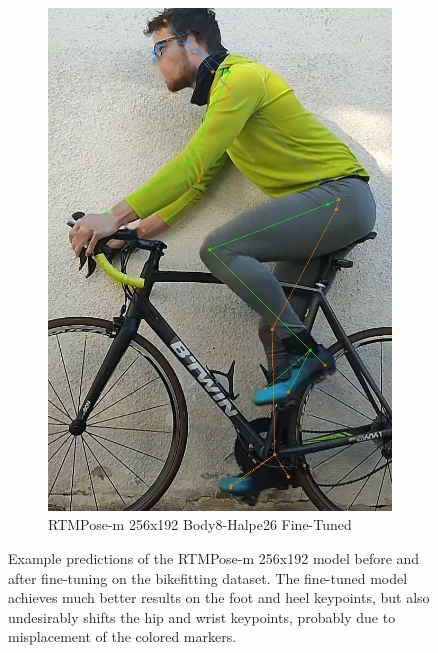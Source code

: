 \begin{figure}[htb]
\begin{subfigure}[t]{\imgwidth}
    \end{subfigure}
    \hfill
    \begin{subfigure}[t]{\imgwidth}
        \centering

        \includegraphics[width=\smallimgwidth]{obrazky-figures/rtmpose-m-256x192_trainedzlute_196_crop.jpg}
        \caption{RTMPose-m 256x192 Body8-Halpe26 Fine-Tuned}
    \end{subfigure}
    \caption{
        Example predictions of the RTMPose-m 256x192 model before and after fine-tuning on the bikefitting dataset. The fine-tuned model achieves much better results on the foot and heel keypoints, but also undesirably shifts the hip and wrist keypoints, probably due to misplacement of the colored markers.}
    \label{fig:trained_examples}
\end{figure}

